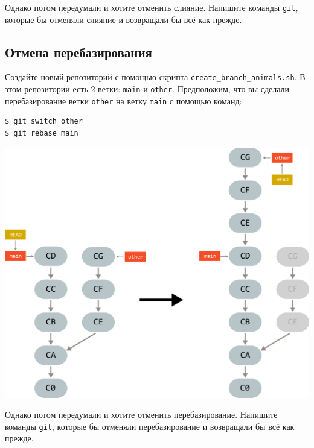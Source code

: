 \documentclass{article}
\begin{document}
\noindent Однако потом передумали и хотите отменить слияние. Напишите команды \texttt{git}, которые бы отменяли слияние и возвращали бы всё как прежде.


\subsection{Отмена перебазирования}
Создайте новый репозиторий с помощью скрипта \texttt{create\_branch\_animals.sh}. В этом репозитории есть 2 ветки: \texttt{main} и \texttt{other}. Предположим, что вы сделали перебазирование ветки \texttt{other} на ветку \texttt{main} с помощью команд:
\begin{lstlisting}[style=csMiptBash]
$ git switch other
$ git rebase main
\end{lstlisting}

\begin{center}
\includegraphics[scale=0.8]{../images/branch_animals_rebase.png}
\end{center}

\noindent Однако потом передумали и хотите отменить перебазирование. Напишите команды \texttt{git}, которые бы отменяли перебазирование и возвращали бы всё как прежде.
\end{document}
